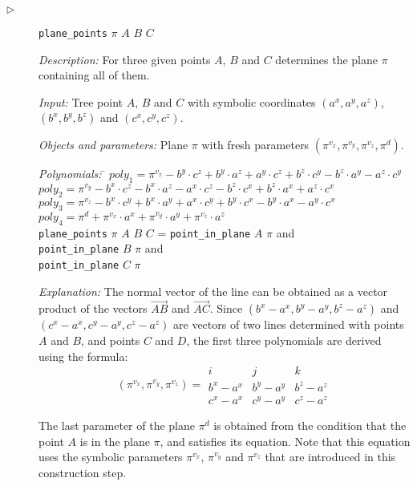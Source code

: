 \documentclass{aicom2e}
\begin{document}
\begin{description}
\item[$\triangleright$] {\tt plane\_points} $\pi$ $A$ $B$ $C$

{\em Description:} For three given points $A$, $B$ and $C$ determines
the plane $\pi$ containing all of them.

{\em Input:} Tree point $A$, $B$ and $C$ with symbolic coordinates
$(a^x, a^y, a^z)$, $(b^x, b^y, b^z)$ and $(c^x, c^y, c^z)$.

{\em Objects and parameters:} Plane $\pi$ with fresh parameters
$(\pi^{v_x}, \pi^{v_y}, \pi^{v_z}, \pi^{d})$.

\begin{tabbing}
{\em Polynomials:} \= $poly_1 = \pi^{v_x} - b^y\cdot c^z + b^y\cdot a^z + a^y\cdot c^z + b^z\cdot c^y - b^z\cdot a^y - a^z\cdot c^y$ \\
                   \> $poly_2 = \pi^{v_y} - b^x\cdot c^z - b^x\cdot a^z - a^x\cdot c^z - b^z\cdot c^x + b^z\cdot a^x + a^z\cdot c^x$ \\
                   \> $poly_3 = \pi^{v_z} - b^x\cdot c^y + b^x\cdot a^y + a^x\cdot c^y + b^y\cdot c^x - b^y\cdot a^x - a^y\cdot c^x$ \\
                   \> $poly_4 = \pi^{d} + \pi^{v_x}\cdot a^x + \pi^{v_y}\cdot a^y + \pi^{v_z}\cdot a^z$ \\
                   \> {\tt plane\_points} $\pi$ $A$ $B$ $C$ = \= {\tt point\_in\_plane} $A$ $\pi$ and \\
                                                              \>\> {\tt point\_in\_plane} $B$ $\pi$ and \\
                                                              \>\> {\tt point\_in\_plane} $C$ $\pi$ \\
\end{tabbing}

{\em Explanation:} The normal vector of the line can be obtained as a
vector product of the vectors $\overrightarrow{AB}$ and
$\overrightarrow{AC}$. Since $(b^x - a^x, b^y - a^y, b^z - a^z)$ and
$(c^x - a^x, c^y - a^y, c^z - a^z)$ are vectors of two lines
determined with points $A$ and $B$, and points $C$ and $D$, the first
three polynomials are derived using the formula:
$$(\pi^{v_x}, \pi^{v_y}, \pi^{v_z}) = \begin{array}{ccc} i & j & k \\ b^x
  - a^x & b^y - a^y & b^z - a^z \\ c^x - a^x & c^y - a^y & c^z - a^z
\end{array}$$

The last parameter of the plane $\pi^{d}$ is obtained from the
condition that the point $A$ is in the plane $\pi$, and satisfies its
equation. Note that this equation uses the symbolic parameters
$\pi^{v_x}$, $\pi^{v_y}$ and $\pi^{v_z}$ that are introduced in this
construction step.
\end{description}
\end{document}
